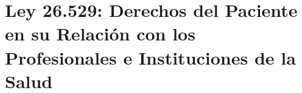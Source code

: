 \section{Ley 26.529: Derechos del Paciente en su Relación con los Profesionales e Instituciones de la Salud}

\label{Ley-26.529}